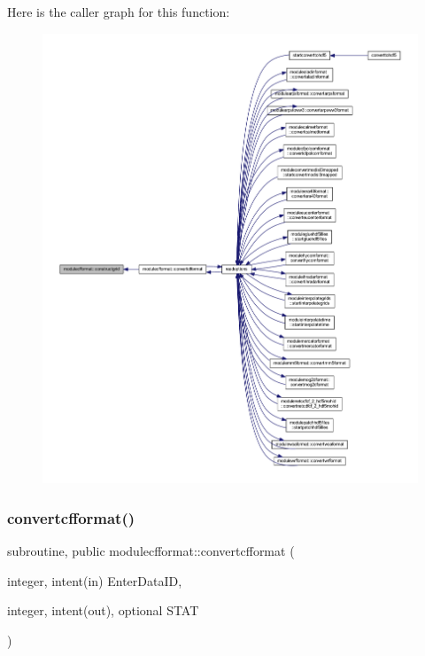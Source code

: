 Here is the caller graph for this function\+:\nopagebreak
\begin{figure}[H]
\begin{center}
\leavevmode
\includegraphics[width=350pt]{namespacemodulecfformat_a9105e21bd9d021767ea028d72b9a201a_icgraph}
\end{center}
\end{figure}
\mbox{\label{namespacemodulecfformat_a66da5c204d14d5f914e0226b731d5b00}} 
\subsubsection{\texorpdfstring{convertcfformat()}{convertcfformat()}}
{\footnotesize\ttfamily subroutine, public modulecfformat\+::convertcfformat (\begin{DoxyParamCaption}\item[{integer, intent(in)}]{Enter\+Data\+ID,  }\item[{integer, intent(out), optional}]{S\+T\+AT }\end{DoxyParamCaption})}

